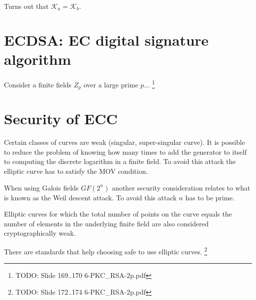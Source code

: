 Turns out that $\mathcal{K}_a = \mathcal{K}_b$.

\section{ECDSA: EC digital signature algorithm}

Consider a finite fields $Z_p$ over a large prime $p$... \footnote{TODO: Slide 169..170 6-PKC\_RSA-2p.pdf}

\section{Security of ECC}

Certain classes of curves are weak (singular, super-singular curve). It is possible to reduce the problem of knowing how many times to add the generator to itself to computing the discrete logarithm in a finite field. To avoid this attack the elliptic curve has to satisfy the MOV condition.

When using Galois fields $GF(2^n)$ another security consideration relates to what is known as the Weil descent attack. To avoid this attack $n$ has to be prime.

Elliptic curves for which the total number of points on the curve equals the number of elements in the underlying finite field are also considered cryptographically weak.

There are standards that help choosing safe to use elliptic curves. \footnote{TODO: Slide 172..174 6-PKC\_RSA-2p.pdf}

